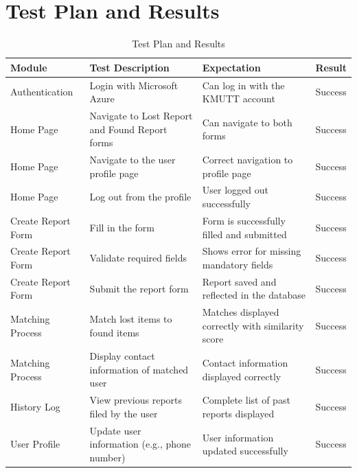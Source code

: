 \section{Test Plan and Results}
\begin{table}[h!]
\centering
\begin{tabular}{|l|p{4cm}|p{4cm}|l|}
\hline
\textbf{Module} & \textbf{Test Description} & \textbf{Expectation} & \textbf{Result} \\
\hline
Authentication & Login with Microsoft Azure & Can log in with the KMUTT account & Success \\
\hline
Home Page & Navigate to Lost Report and Found Report forms & Can navigate to both forms & Success \\
\hline
Home Page & Navigate to the user profile page & Correct navigation to profile page & Success \\
\hline
Home Page & Log out from the profile & User logged out successfully & Success \\
\hline
Create Report Form & Fill in the form & Form is successfully filled and submitted & Success \\
\hline
Create Report Form & Validate required fields & Shows error for missing mandatory fields & Success \\
\hline
Create Report Form & Submit the report form & Report saved and reflected in the database & Success \\
\hline
Matching Process & Match lost items to found items & Matches displayed correctly with similarity score & Success \\
\hline
Matching Process & Display contact information of matched user & Contact information displayed correctly & Success \\
\hline
History Log & View previous reports filed by the user & Complete list of past reports displayed & Success \\
\hline
User Profile & Update user information (e.g., phone number) & User information updated successfully & Success \\
\hline
\end{tabular}
\caption{Test Plan and Results}
\end{table}

